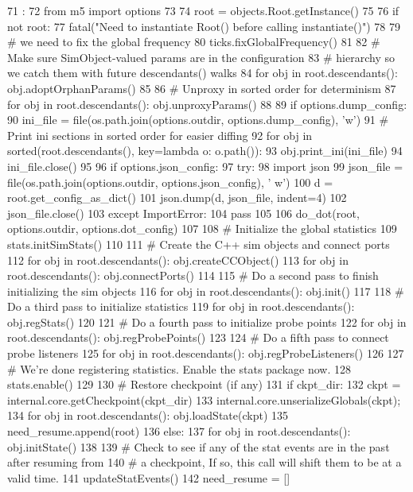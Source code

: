 \begin{DoxyCode}
71                               :
72     from m5 import options
73 
74     root = objects.Root.getInstance()
75 
76     if not root:
77         fatal("Need to instantiate Root() before calling instantiate()")
78 
79     # we need to fix the global frequency
80     ticks.fixGlobalFrequency()
81 
82     # Make sure SimObject-valued params are in the configuration
83     # hierarchy so we catch them with future descendants() walks
84     for obj in root.descendants(): obj.adoptOrphanParams()
85 
86     # Unproxy in sorted order for determinism
87     for obj in root.descendants(): obj.unproxyParams()
88 
89     if options.dump_config:
90         ini_file = file(os.path.join(options.outdir, options.dump_config), 'w')
91         # Print ini sections in sorted order for easier diffing
92         for obj in sorted(root.descendants(), key=lambda o: o.path()):
93             obj.print_ini(ini_file)
94         ini_file.close()
95 
96     if options.json_config:
97         try:
98             import json
99             json_file = file(os.path.join(options.outdir, options.json_config), '
      w')
100             d = root.get_config_as_dict()
101             json.dump(d, json_file, indent=4)
102             json_file.close()
103         except ImportError:
104             pass
105 
106     do_dot(root, options.outdir, options.dot_config)
107 
108     # Initialize the global statistics
109     stats.initSimStats()
110 
111     # Create the C++ sim objects and connect ports
112     for obj in root.descendants(): obj.createCCObject()
113     for obj in root.descendants(): obj.connectPorts()
114 
115     # Do a second pass to finish initializing the sim objects
116     for obj in root.descendants(): obj.init()
117 
118     # Do a third pass to initialize statistics
119     for obj in root.descendants(): obj.regStats()
120 
121     # Do a fourth pass to initialize probe points
122     for obj in root.descendants(): obj.regProbePoints()
123 
124     # Do a fifth pass to connect probe listeners
125     for obj in root.descendants(): obj.regProbeListeners()
126 
127     # We're done registering statistics.  Enable the stats package now.
128     stats.enable()
129 
130     # Restore checkpoint (if any)
131     if ckpt_dir:
132         ckpt = internal.core.getCheckpoint(ckpt_dir)
133         internal.core.unserializeGlobals(ckpt);
134         for obj in root.descendants(): obj.loadState(ckpt)
135         need_resume.append(root)
136     else:
137         for obj in root.descendants(): obj.initState()
138 
139     # Check to see if any of the stat events are in the past after resuming from
140     # a checkpoint, If so, this call will shift them to be at a valid time.
141     updateStatEvents()
142 
need_resume = []
\end{DoxyCode}
